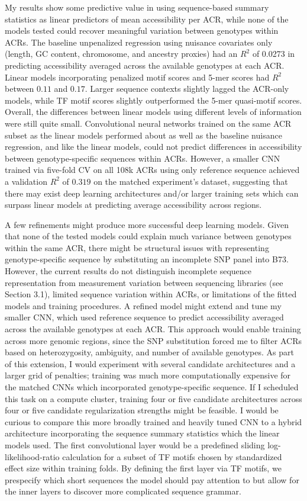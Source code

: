 \documentclass[10pt]{article}
\begin{document}
My results show some predictive value in using sequence-based summary statistics as linear predictors of mean accessibility per ACR, while none of the models tested could recover meaningful variation between genotypes within ACRs. The baseline unpenalized regression using nuisance covariates only (length, GC content, chromosome, and ancestry proxies) had an $R^2$ of  0.0273 in predicting accessibility averaged across the available genotypes at each ACR. Linear models incorporating penalized motif scores and 5-mer scores had $R^2$ between $0.11$ and $0.17$. Larger sequence contexts slightly lagged the ACR-only models, while TF motif scores slightly outperformed the 5-mer quasi-motif scores. Overall, the differences between linear models using different levels of information were still quite small. Convolutional neural networks trained on the same ACR subset as the linear models performed about as well as the baseline nuisance regression, and like the linear models, could not predict differences in accessibility between genotype-specific sequences within ACRs. However, a smaller CNN trained via five-fold CV on all 108k ACRs using only reference sequence achieved a validation $R^2$ of $0.319$ on the matched experiment's dataset, suggesting that there may exist deep learning architectures and/or larger training sets which can surpass linear models at predicting average accessibility across regions. 

A few refinements might produce more successful deep learning models. Given that none of the tested models could explain much variance  between genotypes within the same ACR, there might be structural issues with representing genotype-specific sequence by substituting an incomplete SNP panel into B73. However, the current results do not distinguish incomplete
sequence representation from measurement variation between sequencing libraries (see Section 3.1), limited
sequence variation within ACRs, or limitations of the fitted
models and training procedures. A refined model might extend and tune my smaller CNN, which used reference sequence to predict accessibility averaged across the available genotypes at each ACR. This approach would enable training across more genomic regions, since the SNP substitution forced me to filter ACRs based on heterozygosity,  ambiguity, and number of available genotypes. As part of this extension, I would experiment with several candidate architectures and a larger grid of penalties; training was much more computationally expensive for the matched CNNs which incorporated genotype-specific sequence. If I scheduled this task on a compute cluster, training four or five candidate architectures across four or five candidate regularization strengths might be feasible. I would be curious to compare this more broadly trained and heavily tuned CNN to a hybrid architecture incorporating the sequence summary statistics which the linear models used. The first convolutional layer would be a predefined sliding log-likelihood-ratio calculation for a subset of TF motifs chosen by standardized effect size within training folds. By defining the first layer via TF motifs, we prespecify which short sequences the model should pay attention to but allow for the inner layers to discover more complicated sequence grammar. 
\end{document}
